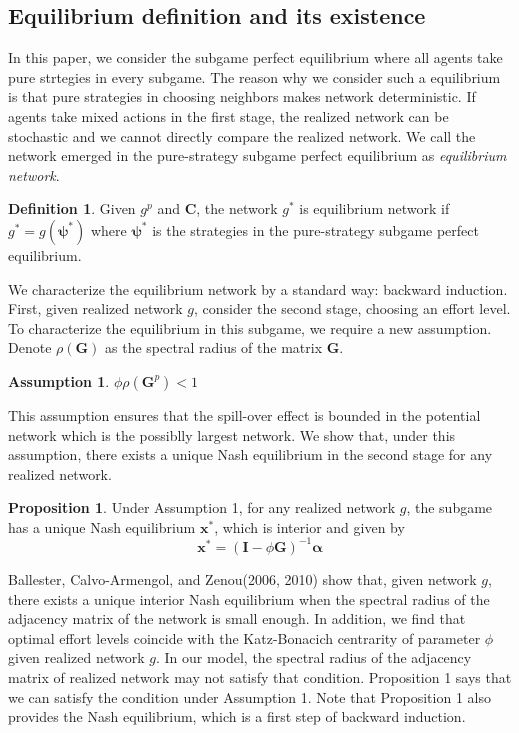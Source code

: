 \documentclass[12pt]{article}
\theoremstyle{definition}
\newtheorem{proposition}{Proposition}
\newtheorem{definition}{Definition}
\newtheorem{assumption}{Assumption}
\begin{document}
\subsection{Equilibrium definition and its existence}

In this paper, we consider the subgame perfect equilibrium where all agents take pure strtegies in every subgame.
The reason why we consider such a equilibrium is that pure strategies in choosing neighbors makes network deterministic.
If agents take mixed actions in the first stage, the realized network can be stochastic and we cannot directly compare the realized network.
We call the network emerged in the pure-strategy subgame perfect equilibrium as {\it{equilibrium network}}.

\begin{definition}
Given $g^p$ and $\bm{C}$, the network $g^*$ is equilibrium network if $g^* = g(\bm{\psi}^*)$ where $\bm{\psi}^*$ is the strategies in the pure-strategy subgame perfect equilibrium.
\end{definition}

We characterize the equilibrium network by a standard way: backward induction.
First, given realized network $g$, consider the second stage, choosing an effort level.
To characterize the equilibrium in this subgame, we require a new assumption.
Denote $\rho (\bm{G})$ as the spectral radius of the matrix $\bm{G}$.

\begin{assumption}
$\phi \rho(\bm{G}^p) < 1$
\end{assumption}

This assumption ensures that the spill-over effect is bounded in the potential network which is the possiblly largest network.
We show that, under this assumption, there exists a unique Nash equilibrium in the second stage for any realized network.

\begin{proposition}
Under Assumption 1, for any realized network $g$, the subgame has a unique Nash equilibrium $\bm{x}^*$, which is interior and given by
\[ \bm{x}^* = {(\bm{I} - \phi \bm{G})}^{-1} \bm{\alpha} \]
\end{proposition}

Ballester, Calvo-Armengol, and Zenou(2006, 2010) show that, given network $g$, there exists a unique interior Nash equilibrium when the spectral radius of the adjacency matrix of the network is small enough.
In addition, we find that optimal effort levels coincide with the Katz-Bonacich centrarity of parameter $\phi$ given realized network $g$.
In our model, the spectral radius of the adjacency matrix of realized network may not satisfy that condition.
Proposition 1 says that we can satisfy the condition under Assumption 1.
Note that Proposition 1 also provides the Nash equilibrium, which is a first step of backward induction.
\end{document}
